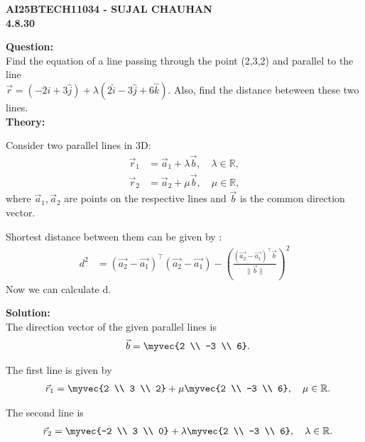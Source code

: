 \documentclass[12pt]{article}
\begin{document}
\newpage
\begin{center}
\textbf{\Large AI25BTECH11034 - SUJAL CHAUHAN }\\
\textbf{4.8.30}
\end{center}

\textbf{Question:}\\
Find the equation of a line passing through the point (2,3,2) and parallel to the line \\
$\Vec{r}= (-2\hat{i}+3\hat{j})+\lambda(2\hat{i}-3\hat{j}+6\hat{k})$. Also, find the distance beteween these two lines.\\[2cm]

\textbf{Theory:}  

Consider two parallel lines in 3D:
\begin{align}
    \vec{r}_1 &= \vec{a}_1 + \lambda \vec{b}, \quad \lambda \in \mathbb{R}, \\[6pt]
    \vec{r}_2 &= \vec{a}_2 + \mu \vec{b}, \quad \mu \in \mathbb{R},
\end{align}
where $\vec{a}_1, \vec{a}_2$ are points on the respective lines and $\vec{b}$ is the common direction vector.  


Shortest distance between them can be given by :
\begin{align}
    d^2 
    &= (\vec{a_2} - \vec{a_1})^\top (\vec{a_2} - \vec{a_1})
    - \left( \frac{ (\vec{a_2} - \vec{a_1})^\top \vec{b} }{ \lVert \vec{b} \rVert } \right)^2
\end{align}
Now we can calculate d.



\textbf{Solution:}\\[2cm]
The direction vector of the given parallel lines is
\begin{align}
    \vec{b} = \myvec{2 \\ -3 \\ 6}.
\end{align}

The first line is given by
\begin{align}
    \vec{r}_1 = \myvec{2 \\ 3 \\ 2} + \mu \myvec{2 \\ -3 \\ 6}, \quad \mu \in \mathbb{R}.
\end{align}

The second line is
\begin{align}
    \vec{r}_2 = \myvec{-2 \\ 3 \\ 0} + \lambda \myvec{2 \\ -3 \\ 6}, \quad \lambda \in \mathbb{R}.
\end{align}
\end{document}
